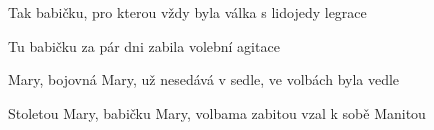 \begin{song}
\bigskip

Tak babičku, pro kterou vždy byla válka s lidojedy legrace \par
{}Tu babičku za pár dni zabila volební agitace \par
{} \par

\bigskip

Mary, bojovná Mary, už nesedává v sedle, ve volbách byla vedle  \par
Stoletou Mary, babičku  Mary, volbama zabitou vzal k sobě Manitou \par

\end{song}
